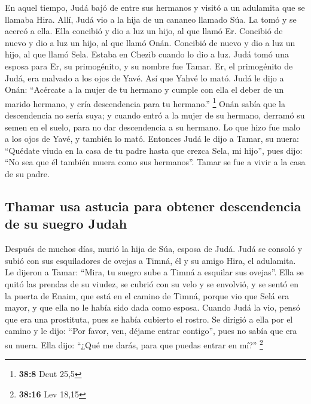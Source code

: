  En aquel tiempo, Judá bajó de entre sus hermanos y visitó
a un adulamita que se llamaba Hira.  Allí, Judá vio a la
hija de un cananeo llamado Súa. La tomó y se acercó a ella.
 Ella concibió y dio a luz un hijo, al que llamó Er.
 Concibió de nuevo y dio a luz un hijo, al que llamó Onán.
 Concibió de nuevo y dio a luz un hijo, al que llamó Sela.
Estaba en Chezib cuando lo dio a luz.  Judá tomó una
esposa para Er, su primogénito, y su nombre fue Tamar. 
Er, el primogénito de Judá, era malvado a los ojos de Yavé. Así que
Yahvé lo mató.  Judá le dijo a Onán: ``Acércate a la mujer
de tu hermano y cumple con ella el deber de un marido hermano, y cría
descendencia para tu hermano.'' \footnote{\textbf{38:8} Deut 25,5}
 Onán sabía que la descendencia no sería suya; y cuando
entró a la mujer de su hermano, derramó su semen en el suelo, para no
dar descendencia a su hermano.  Lo que hizo fue malo a
los ojos de Yavé, y también lo mató.  Entonces Judá le
dijo a Tamar, su nuera: ``Quédate viuda en la casa de tu padre hasta que
crezca Sela, mi hijo'', pues dijo: ``No sea que él también muera como
sus hermanos''. Tamar se fue a vivir a la casa de su padre.

\hypertarget{thamar-usa-astucia-para-obtener-descendencia-de-su-suegro-judah}{%
\subsection{Thamar usa astucia para obtener descendencia de su suegro
Judah}\label{thamar-usa-astucia-para-obtener-descendencia-de-su-suegro-judah}}

 Después de muchos días, murió la hija de Súa, esposa de
Judá. Judá se consoló y subió con sus esquiladores de ovejas a Timná, él
y su amigo Hira, el adulamita.  Le dijeron a Tamar:
``Mira, tu suegro sube a Timná a esquilar sus ovejas''. 
Ella se quitó las prendas de su viudez, se cubrió con su velo y se
envolvió, y se sentó en la puerta de Enaim, que está en el camino de
Timná, porque vio que Selá era mayor, y que ella no le había sido dada
como esposa.  Cuando Judá la vio, pensó que era una
prostituta, pues se había cubierto el rostro.  Se dirigió
a ella por el camino y le dijo: ``Por favor, ven, déjame entrar
contigo'', pues no sabía que era su nuera. Ella dijo: ``¿Qué me darás,
para que puedas entrar en mí?'' \footnote{\textbf{38:16} Lev 18,15}

